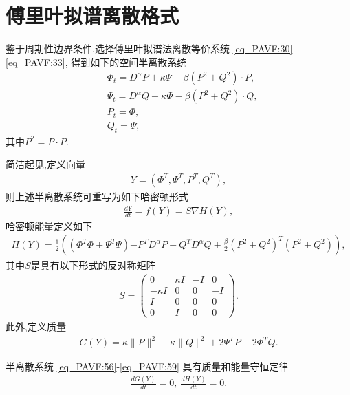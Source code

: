 \section{傅里叶拟谱离散格式}\label{Section_PAVF: 2_2}

鉴于周期性边界条件,选择傅里叶拟谱法离散等价系统 \eqref{eq_PAVF:30}-\eqref{eq_PAVF:33},
得到如下的空间半离散系统
\begin{align}
&\varPhi_{t}=D^{\alpha}P+\kappa \Psi-\beta \left( P^{2}+Q^{2}\right)\cdot P,\label{eq_PAVF:56}\\
&\Psi_{t}=D^{\alpha}Q-\kappa \varPhi-\beta \left( P^{2}+Q^{2}\right)\cdot Q,\label{eq_PAVF:57}\\
&P_t=\varPhi,\label{eq_PAVF:58}\\
&Q_t=\Psi,\label{eq_PAVF:59}
\end{align}
其中$P^{2}=P \cdot P$.

简洁起见,定义向量
\begin{align}\label{eq_PAVF:60a}
Y=\left(\varPhi^{T}, \Psi^{T}, P^{T}, Q^{T}\right),
\end{align}
则上述半离散系统可重写为如下哈密顿形式
\begin{align}\label{eq_PAVF:60}
\frac{d Y}{d t}=f(Y)=S \nabla H(Y),
\end{align}
哈密顿能量定义如下
\begin{align}\label{eq_PAVF:61}
	H(Y)=\frac{1}{2}\left((\varPhi^{T}\varPhi+\Psi^{T}\Psi){-P^{T} D^{\alpha} P-Q^{T} D^{\alpha} Q}+\frac{\beta}{2}(P^2+Q^2)^{T}(P^2+Q^2)\right),
\end{align}
其中$S$是具有以下形式的反对称矩阵
\begin{align}\label{eq_PAVF:62}
S=\left(\begin{array}{cccc}
0 & \kappa I & -I & 0 \\
-\kappa I & 0 & 0 & -I \\
I & 0 & 0 & 0 \\
0 & I & 0 & 0
\end{array}\right).
\end{align}
此外,定义质量
\begin{align}\label{eq_PAVF:63}
G(Y)=\kappa\|P\|^{2}+\kappa\|Q\|^{2} +2\Psi^{T}P-2\varPhi^{T}Q.
\end{align}

\begin{theorem}	\label{thm_PAVF:3}
	半离散系统 \eqref{eq_PAVF:56}-\eqref{eq_PAVF:59} 具有质量和能量守恒定律
\begin{align}
\frac{d G(Y)}{d t}=0,~\frac{d H(Y)}{d t}=0.
\end{align}
\end{theorem}

